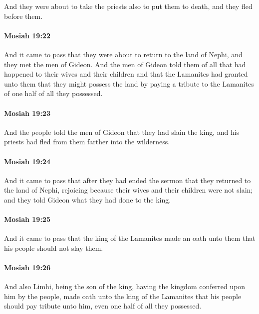 			And they were about to take the priests also to put them to death,
			and they fled before them.

		\paragraph{Mosiah 19:22} %
			\label{MOSIAH-19-22}

			And it came to pass that
			they were about to return to the land of Nephi,
			and they met the men of Gideon.
			And the men of Gideon told them
			of all that had happened to their wives and their children
			and that the Lamanites had granted unto them
			that they might possess the land
			by paying a tribute to the Lamanites of one half of all they possessed.

		\paragraph{Mosiah 19:23} %
			\label{MOSIAH-19-23}

			And the people told the men of Gideon that they had slain the king,
			and his priests had fled from them farther into the wilderness.

		\paragraph{Mosiah 19:24} %
			\label{MOSIAH-19-24}

			And it came to pass that after they had ended the sermon
			that they returned to the land of Nephi,
			rejoicing because their wives and their children were not slain;
			and they told Gideon what they had done to the king.

		\paragraph{Mosiah 19:25} %
			\label{MOSIAH-19-25}

			And it came to pass that the king of the Lamanites made an oath unto them
			that his people should not slay them.

		\paragraph{Mosiah 19:26} %
			\label{MOSIAH-19-26}

			And also Limhi, being the son of the king,
			having the kingdom conferred upon him by the people,
			made oath unto the king of the Lamanites
			that his people should pay tribute unto him,
			even one half of all they possessed.


